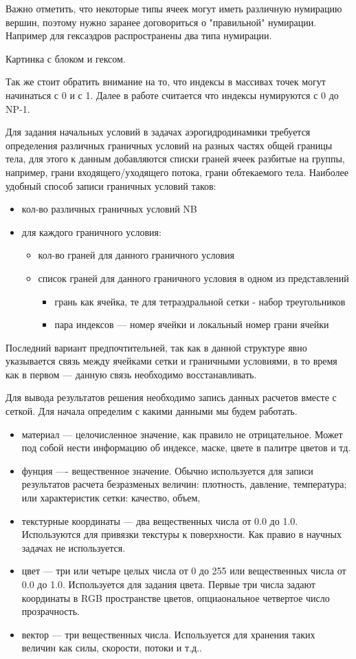 \documentclass[a4paper,12pt]{article}
\begin{document}
Важно отметить, что некоторые типы ячеек могут иметь различную нумирацию вершин, поэтому нужно заранее договориться о "правильной" нумирации. Например для гексаэдров распространены два типа нумирации.

Картинка с блоком и гексом.

Так же стоит обратить внимание на то, что индексы в массивах точек могут начинаться с 0 и с 1. Далее в работе считается что индексы нумируются с 0 до NP-1.

Для задания начальных условий в задачах аэрогидродинамики требуется определения различных граничных условий на разных частях общей границы тела, для этого к данным добавляются списки граней ячеек разбитые на группы, например, грани входящего/уходящего потока, грани обтекаемого тела. Наиболее удобный способ записи граничных условий таков:
\begin{itemize}
\item кол-во различных граничных условий NB
\item для каждого граничного условия:
\begin{itemize}
\item кол-во граней для данного граничного условия
\item список граней для данного граничного условия в одном из представлений
\begin{itemize}
\item грань как ячейка, те для тетраэдральной сетки - набор треугольников
\item пара индексов --- номер ячейки и локальный номер грани ячейки
\end{itemize}
\end{itemize}
\end{itemize}

Последний вариант предпочтительней, так как в данной структуре явно указывается связь между ячейками сетки и граничными условиями, в то время как в первом --- данную связь необходимо восстанавливать.

Для вывода результатов решения необходимо запись данных расчетов вместе с сеткой. Для начала определим с какими данными мы будем работать.
\begin{itemize}
\item материал --- целочисленное значение, как правило не отрицательное. Может под собой нести информацию об индексе, маске, цвете в палитре цветов и тд.
\item фунция ---- вещественное значение. Обычно используется для записи результатов расчета безразменых величин: плотность, давление, температура; или характеристик сетки: качество, объем,
\item текстурные координаты --- два вещественных числа от 0.0 до 1.0. Используются для привязки текстуры к поверхности. Как правио в научных задачах не используется.
\item цвет --- три или четыре целых числа от 0 до 255 или вещественных числа от 0.0 до 1.0. Используется для задания цвета. Первые три числа задают координаты в RGB пространстве цветов, опциаональное четвертое число прозрачность.
\item вектор --- три вещественных числа. Используется для хранения таких величин как силы, скорости, потоки и т.д..
\end{itemize}
\end{document}
